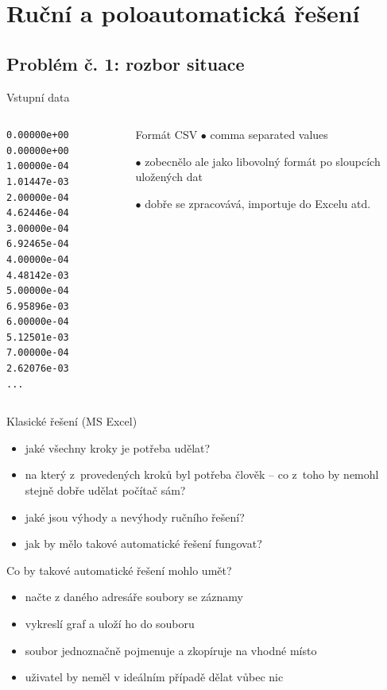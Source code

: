 \documentclass{beamer}
\begin{document}
\section{Ruční a poloautomatická řešení}

\subsection{Problém č. 1: rozbor situace}

\begin{frame}[fragile]{Vstupní data}
  \begin{columns}
      {\scriptsize
      \begin{verbatim}
0.00000e+00 0.00000e+00
1.00000e-04 1.01447e-03
2.00000e-04 4.62446e-04
3.00000e-04 6.92465e-04
4.00000e-04 4.48142e-03
5.00000e-04 6.95896e-03
6.00000e-04 5.12501e-03
7.00000e-04 2.62076e-03
...
      \end{verbatim}
      }
      \begin{block}{Formát CSV}
        $\bullet$ comma separated values

        $\bullet$ zobecnělo ale jako libovolný formát po sloupcích uložených dat

        $\bullet$ dobře se zpracovává, importuje do Excelu atd.
      \end{block}
  \end{columns}
\end{frame}

\begin{frame}{Klasické řešení (MS Excel)}
  \begin{itemize}
    \item jaké všechny kroky je potřeba udělat?
    \item na který z~provedených kroků byl potřeba člověk -- co z~toho by nemohl stejně dobře udělat počítač sám?
    \item jaké jsou výhody a nevýhody ručního řešení?
    \item jak by mělo takové automatické řešení fungovat?
  \end{itemize}
\end{frame}

\begin{frame}{Co by takové automatické řešení mohlo umět?}
  \begin{itemize}
    \item načte z daného adresáře soubory se záznamy
    \item vykreslí graf a uloží ho do souboru
    \item soubor jednoznačně pojmenuje a zkopíruje na vhodné místo
    \item uživatel by neměl v ideálním případě dělat vůbec nic
  \end{itemize}
\end{frame}
\end{document}
